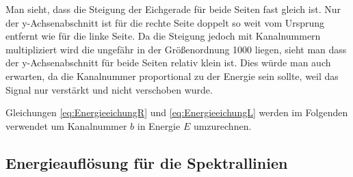 Man sieht, dass die Steigung der Eichgerade für beide Seiten fast gleich ist.
Nur der y-Achsenabschnitt ist für die rechte Seite doppelt so weit vom Ursprung entfernt wie für die linke Seite.
Da die Steigung jedoch mit Kanalnummern multipliziert wird die ungefähr in der Größenordnung 1000 liegen, sieht man dass der y-Achsenabschnitt für beide Seiten relativ klein ist.
Dies würde man auch erwarten, da die Kanalnummer proportional zu der Energie sein sollte, weil das Signal nur verstärkt und nicht verschoben wurde.

Gleichungen \ref{eq:EnergieeichungR} und \ref{eq:EnergieeichungL} werden im Folgenden verwendet um Kanalnummer $b$ in Energie $E$ umzurechnen.

\subsection{Energieauflösung für die Spektrallinien}

